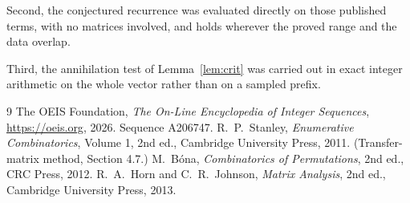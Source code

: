 \documentclass[11pt,a4paper]{article}
\theoremstyle{plain}
\theoremstyle{definition}
\begin{document}
Second, the conjectured recurrence was evaluated directly on those published terms, with no
matrices involved, and holds wherever the proved range and the data overlap.

Third, the annihilation test of Lemma~\ref{lem:crit} was carried out in exact integer
arithmetic on the whole vector rather than on a sampled prefix.

\begin{thebibliography}{9}
 The OEIS Foundation, \emph{The On-Line Encyclopedia of Integer
Sequences}, \url{https://oeis.org}, 2026. Sequence A206747.
 R.~P.~Stanley, \emph{Enumerative Combinatorics}, Volume 1, 2nd ed.,
Cambridge University Press, 2011. (Transfer-matrix method, Section 4.7.)
 M.~B\'ona, \emph{Combinatorics of Permutations}, 2nd ed., CRC
Press, 2012.
 R.~A.~Horn and C.~R.~Johnson, \emph{Matrix Analysis}, 2nd ed., Cambridge
University Press, 2013.
\end{thebibliography}
\end{document}
